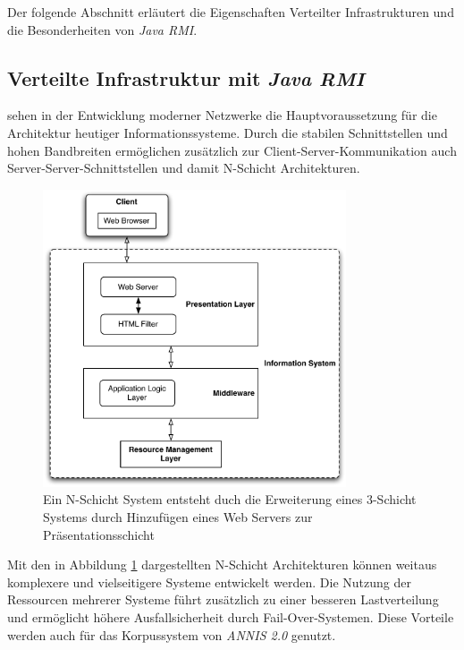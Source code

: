 Der folgende Abschnitt erläutert die Eigenschaften Verteilter Infrastrukturen und die Besonderheiten von \emph{Java RMI}.

\subsection{Verteilte Infrastruktur mit \emph{Java RMI}}\label{sec:RMI}

\cite{alonso2004webservices} sehen in der Entwicklung moderner Netzwerke die Hauptvoraussetzung für die Architektur heutiger Informationssysteme. Durch die stabilen Schnittstellen und hohen Bandbreiten ermöglichen zusätzlich zur Client-Server-Kommunikation auch Server-Server-Schnittstellen und damit N-Schicht Architekturen.

\begin{figure}[H]
	\centering
	\includegraphics*[width=0.8\textwidth]{figures/DA/N-SchichtArchitektur.pdf}
	\caption{Ein N-Schicht System entsteht duch die Erweiterung eines 3-Schicht Systems durch Hinzufügen eines Web Servers zur Präsentationsschicht \citep[vgl.][S. 20]{alonso2004webservices}}\label{fig:N-SchichtArchitektur}
\end{figure}

Mit den in Abbildung \ref{fig:N-SchichtArchitektur} dargestellten N-Schicht Architekturen können weitaus komplexere und vielseitigere Systeme entwickelt werden. Die Nutzung der Ressourcen mehrerer Systeme führt zusätzlich zu einer besseren Lastverteilung und ermöglicht höhere Ausfallsicherheit durch Fail-Over-Systemen. Diese Vorteile werden auch für das Korpussystem von \emph{ANNIS 2.0} genutzt.

